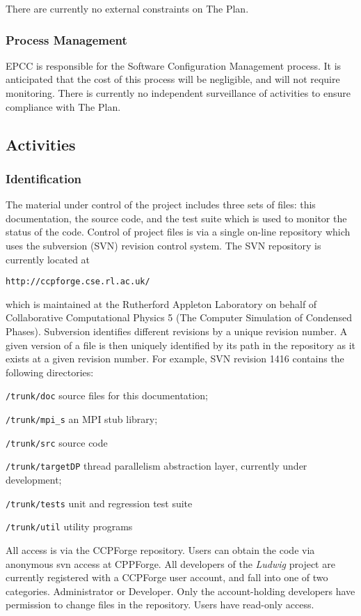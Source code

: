 \documentclass[11pt,twoside]{article}
\begin{document}
There are currently no external constraints on The Plan.

\subsubsection{Process Management}

EPCC is responsible for the Software Configuration Management process.
It is anticipated that the cost of this process will be negligible, and
will not require monitoring. There is currently no independent
surveillance of activities to ensure compliance with The Plan.

\subsection{Activities}

\subsubsection{Identification}

The material under control of the project includes three sets of files:
this documentation, the source code, and the test suite which is used
to monitor the status of the code.
Control of project files is via a single on-line repository which
uses the subversion (SVN) revision control system. The SVN repository
is currently located at

\texttt{http://ccpforge.cse.rl.ac.uk/}

which is maintained at the Rutherford Appleton Laboratory on behalf
of Collaborative Computational Physics 5 (The Computer Simulation of
Condensed Phases). Subversion identifies different revisions by a
unique revision number. A given version of a file is then uniquely
identified by its path in the repository as it exists at a given
revision number. For example, SVN revision 1416 contains the
following directories:


\texttt{/trunk/doc} source files for this documentation;

\texttt{/trunk/mpi\_s} an MPI stub library;

\texttt{/trunk/src} source code

\texttt{/trunk/targetDP} thread parallelism abstraction layer, currently
under development;

\texttt{/trunk/tests} unit and regression test suite

\texttt{/trunk/util} utility programs

All access is via the CCPForge repository. Users can obtain the code
via anonymous svn access at CPPForge.
All developers of the \textit{Ludwig} project are currently registered with
a CCPForge user account, and fall into one of two categories.
Administrator or Developer. Only the account-holding developers have
permission to change files in the repository. Users have read-only
access.
\end{document}
